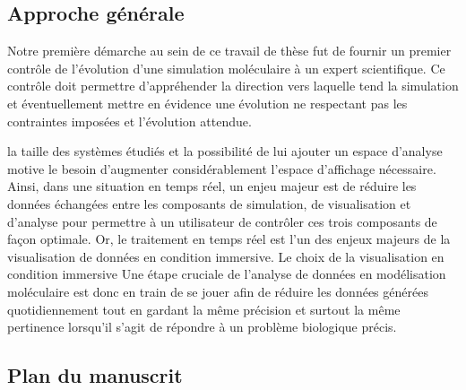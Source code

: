  
\subsection*{Approche générale}

Notre première démarche au sein de ce travail de thèse fut de fournir un premier contrôle de l'évolution d'une simulation moléculaire à un expert scientifique. Ce contrôle doit permettre d'appréhender la direction vers laquelle tend la simulation et éventuellement mettre en évidence une évolution ne respectant pas les contraintes imposées et l'évolution attendue. 

la taille des systèmes étudiés et la possibilité de lui ajouter un espace d'analyse motive le besoin d'augmenter considérablement l'espace d'affichage nécessaire. Ainsi, dans une situation en temps réel, un enjeu majeur est de réduire les données échangées entre les composants de simulation, de visualisation et d'analyse pour permettre à un utilisateur de contrôler ces trois composants de façon optimale. Or, le traitement en temps réel est l'un des enjeux majeurs de la visualisation de données en condition immersive. Le choix de la visualisation en condition immersive Une étape cruciale de l'analyse de données en modélisation moléculaire est donc en train de se jouer afin de réduire les données générées quotidiennement tout en gardant la même précision et surtout la même pertinence lorsqu'il s'agit de répondre à un problème biologique précis.


\subsection*{Plan du manuscrit}


\lipsum[1-3]